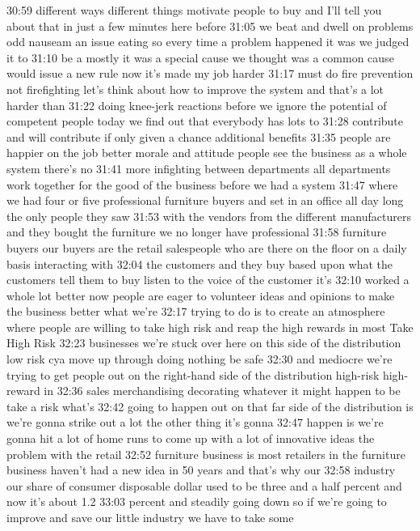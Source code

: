 \documentclass[
]{book}
\begin{document}
30:59
different ways different things motivate people to buy and I'll tell you about that in just a few minutes here before
31:05
we beat and dwell on problems odd nauseam an issue eating so every time a problem happened it was we judged it to
31:10
be a mostly it was a special cause we thought was a common cause would issue a new rule now it's made my job harder
31:17
must do fire prevention not firefighting let's think about how to improve the system and that's a lot harder than
31:22
doing knee-jerk reactions before we ignore the potential of competent people today we find out that everybody has lots to
31:28
contribute and will contribute if only given a chance additional benefits
31:35
people are happier on the job better morale and attitude people see the business as a whole system there's no
31:41
more infighting between departments all departments work together for the good of the business before we had a system
31:47
where we had four or five professional furniture buyers and set in an office all day long the only people they saw
31:53
with the vendors from the different manufacturers and they bought the furniture we no longer have professional
31:58
furniture buyers our buyers are the retail salespeople who are there on the floor on a daily basis interacting with
32:04
the customers and they buy based upon what the customers tell them to buy listen to the voice of the customer it's
32:10
worked a whole lot better now people are eager to volunteer ideas and opinions to make the business better what we're
32:17
trying to do is to create an atmosphere where people are willing to take high risk and reap the high rewards in most
Take High Risk
32:23
businesses we're stuck over here on this side of the distribution low risk cya move up through doing nothing be safe
32:30
and mediocre we're trying to get people out on the right-hand side of the distribution high-risk high-reward in
32:36
sales merchandising decorating whatever it might happen to be take a risk what's
32:42
going to happen out on that far side of the distribution is we're gonna strike out a lot the other thing it's gonna
32:47
happen is we're gonna hit a lot of home runs to come up with a lot of innovative ideas the problem with the retail
32:52
furniture business is most retailers in the furniture business haven't had a new idea in 50 years and that's why our
32:58
industry our share of consumer disposable dollar used to be three and a half percent and now it's about 1.2
33:03
percent and steadily going down so if we're going to improve and save our little industry we have to take some
\end{document}
